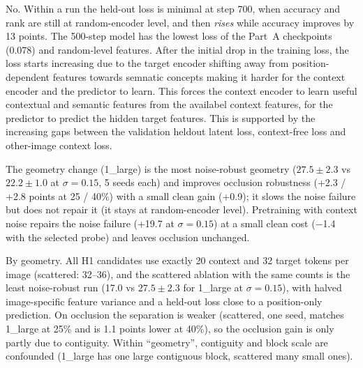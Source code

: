 \begin{description}[leftmargin=0pt,itemsep=2pt]
\item[Does lower prediction loss correspond to better features?] No. Within a run the held-out loss is minimal at step 700,
when accuracy and rank are still at random-encoder level, and then \emph{rises} while accuracy improves by 13 points.
The 500-step model has the lowest loss of the Part~A
checkpoints (0.078) and random-level features. 
After the initial drop in the training loss, the loss starts increasing due to the target encoder shifting away from 
position-dependent features towards semnatic concepts making it harder for the context encoder and the predictor to learn.
This forces the context encoder to learn useful contextual and semantic features from the availabel context features, 
for the predictor to predict the hidden target features. This is supported by the increasing gaps between the validation 
heldout latent loss, context-free loss and other-image context loss.

\item[Does the change improve clean classification, occlusion robustness, or both?] The geometry change 
(1\_large) is the most
noise-robust geometry ($27.5{\pm}2.3$ vs $22.2{\pm}1.0$ at $\sigma{=}0.15$, 5 seeds each) and improves occlusion robustness
(+2.3 / +2.8 points at 25 / 40\%) with a small clean gain (+0.9); it slows the noise failure but does not repair it (it stays
at random-encoder level). Pretraining with context noise repairs the noise failure (+19.7 at $\sigma{=}0.15$) at a small clean cost ($-$1.4 with the
selected probe) and leaves occlusion unchanged. 

\item[Are gains caused by mask geometry, or by a change in visible/target counts?] By geometry. All H1 candidates use exactly
20 context and 32 target tokens per image (scattered: 32--36), and the scattered
ablation with the same counts is the least noise-robust run (17.0 vs $27.5{\pm}2.3$ for 1\_large at $\sigma{=}0.15$), with
halved image-specific feature variance and a held-out loss close to a position-only prediction. On occlusion the separation
is weaker (scattered, one seed, matches 1\_large at 25\% and is 1.1 points lower at 40\%), so the occlusion gain is only
partly due to contiguity. Within ``geometry'',
contiguity and block scale are confounded (1\_large has one large contiguous block, scattered many small ones).


\end{description}
